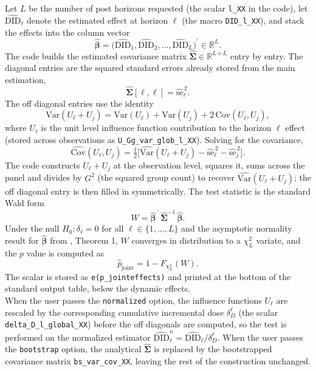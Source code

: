  Let $L$ be the number of post horizons requested (the scalar \texttt{l\_XX} in the code), let $\widehat{\mathrm{DID}}_\ell$ denote the estimated effect at horizon $\ell$ (the macro \texttt{DID\_l\_XX}), and stack the effects into the column vector
\[
\widehat{\boldsymbol{\beta}} = \bigl(\widehat{\mathrm{DID}}_1, \widehat{\mathrm{DID}}_2, \dots, \widehat{\mathrm{DID}}_L\bigr)^{\prime} \in \mathbb{R}^{L}.
\]
The code builds the estimated covariance matrix $\widehat{\boldsymbol{\Sigma}} \in \mathbb{R}^{L \times L}$ entry by entry. The diagonal entries are the squared standard errors already stored from the main estimation,
\[
\widehat{\boldsymbol{\Sigma}}[\ell, \ell] = \widehat{\mathrm{se}}_\ell^{\,2}.
\]
The off diagonal entries use the identity
\[
\mathrm{Var}(U_\ell + U_j) = \mathrm{Var}(U_\ell) + \mathrm{Var}(U_j) + 2\, \mathrm{Cov}(U_\ell, U_j),
\]
where $U_\ell$ is the unit level influence function contribution to the horizon $\ell$ effect (stored across observations as \texttt{U\_Gg\_var\_glob\_l\_XX}). Solving for the covariance,
\[
\widehat{\mathrm{Cov}}(U_\ell, U_j) = \tfrac{1}{2}\bigl[\widehat{\mathrm{Var}}(U_\ell + U_j) - \widehat{\mathrm{se}}_\ell^{\,2} - \widehat{\mathrm{se}}_j^{\,2}\bigr].
\]
The code constructs $U_\ell + U_j$ at the observation level, squares it, sums across the panel and divides by $G^2$ (the squared group count) to recover $\widehat{\mathrm{Var}}(U_\ell + U_j)$; the off diagonal entry is then filled in symmetrically. The test statistic is the standard Wald form
\[
W = \widehat{\boldsymbol{\beta}}^{\,\prime}\, \widehat{\boldsymbol{\Sigma}}^{-1}\, \widehat{\boldsymbol{\beta}}.
\]
Under the null $H_0: \delta_\ell = 0$ for all $\ell \in \{1, \dots, L\}$ and the asymptotic normality result for $\widehat{\boldsymbol{\beta}}$ from \citet{dCDH2024}, Theorem 1, $W$ converges in distribution to a $\chi^2_L$ variate, and the $p$ value is computed as
\[
\widehat{p}_{\text{joint}} = 1 - F_{\chi^2_L}(W).
\]
The scalar is stored as \texttt{e(p\_jointeffects)} and printed at the bottom of the standard output table, below the dynamic effects.\\

 When the user passes the \texttt{normalized} option, the influence functions $U_\ell$ are rescaled by the corresponding cumulative incremental dose $\delta_D^\ell$ (the scalar \texttt{delta\_D\_l\_global\_XX}) before the off diagonals are computed, so the test is performed on the normalized estimator $\widehat{\mathrm{DID}}_\ell^n = \widehat{\mathrm{DID}}_\ell / \delta_D^\ell$. When the user passes the \texttt{bootstrap} option, the analytical $\widehat{\boldsymbol{\Sigma}}$ is replaced by the bootstrapped covariance matrix \texttt{bs\_var\_cov\_XX}, leaving the rest of the construction unchanged.\\

